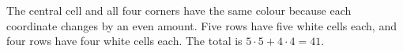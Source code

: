 The central cell and all four corners have the same colour because each coordinate changes by an even amount. Five rows have five white cells each, and four rows have four white cells each. The total is $5\cdot5+4\cdot4=\boxed{41}$.
